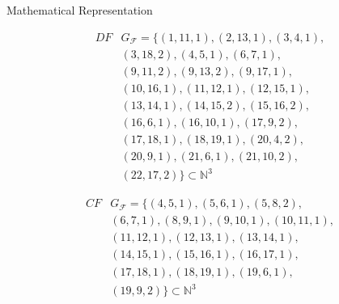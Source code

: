 \begin{blackbox}{Mathematical Representation}
    \centering
    \begin{minipage}{0.329\textwidth}
        \begin{graybox}
            \scriptsize
            \setlength{\abovedisplayskip}{0pt}
            \setlength{\belowdisplayskip}{0pt}
            \vspace{-0.5em}
            \begin{align*}
                DF&G_\mathcal F=\{(1,11,1),(2,13,1),(3,4,1),\\[-0.5em]
                  &(3,18,2),(4,5,1),(6,7,1),\\[-0.5em]
                  &(9,11,2),(9,13,2),(9,17,1),\\[-0.5em]
                  &(10,16,1),(11,12,1),(12,15,1),\\[-0.5em]
                  &(13,14,1),(14,15,2),(15,16,2),\\[-0.5em]
                  &(16,6,1),(16,10,1),(17,9,2),\\[-0.5em]
                  &(17,18,1),(18,19,1),(20,4,2),\\[-0.5em]
                  &(20,9,1),(21,6,1),(21,10,2),\\[-0.5em]
                  &(22,17,2)\}\subset\mathbb N^3
            \end{align*}
        \end{graybox}
    \end{minipage}
    \begin{minipage}{0.329\textwidth}
        \begin{graybox}
            \scriptsize
            \setlength{\abovedisplayskip}{0pt}
            \setlength{\belowdisplayskip}{0pt}
            \vspace{-0.5em}
            \begin{align*}
                CF&G_\mathcal F=\{(4,5,1),(5,6,1),(5,8,2),\\[-0.5em]
                  &(6,7,1),(8,9,1),(9,10,1),(10,11,1),\\[-0.5em]
                  &(11,12,1),(12,13,1),(13,14,1),\\[-0.5em]
                  &(14,15,1),(15,16,1),(16,17,1),\\[-0.5em]
                  &(17,18,1),(18,19,1),(19,6,1),\\[-0.5em]
                  &(19,9,2)\}\subset\mathbb N^3
            \end{align*}


\end{graybox}
\end{minipage}
\end{blackbox}
